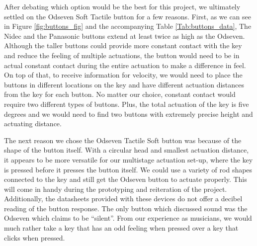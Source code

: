 \begin{table}[h!]
  \centering
  \caption{}
  \label{Tab:buttons_data}
\end{table}

After debating which option would be the best for this project, we ultimately settled on the Odseven Soft Tactile button for a few reasons. First, as we can see in Figure \ref{fig:buttons_fig} and the accompanying Table \ref{Tab:buttons_data}, The Nidec and the Panasonic buttons extend at least twice as high as the Odseven. Although the taller buttons could provide more constant contact with the key and reduce the feeling of multiple actuations, the button would need to be in actual constant contact during the entire actuation to make a difference in feel. On top of that, to receive information for velocity, we would need to place the buttons in different locations on the key and have different actuation distances from the key for each button. No matter our choice, constant contact would require two different types of buttons. Plus, the total actuation of the key is five degrees and we would need to find two buttons with extremely precise height and actuating distance.

The next reason we chose the Odseven Tactile Soft button was because of the shape of the button itself. With a circular head and smallest actuation distance, it appears to be more versatile for our multistage actuation set-up, where the key is pressed before it presses the button itself. We could use a variety of rod shapes connected to the key and still get the Odseven button to actuate properly. This will come in handy during the prototyping and reiteration of the project. Additionally, the datasheets provided with these devices do not offer a decibel reading of the button response. The only button which discussed sound was the Odseven which claims to be “silent”. From our experience as musicians, we would much rather take a key that has an odd feeling when pressed over a key that clicks when pressed.

